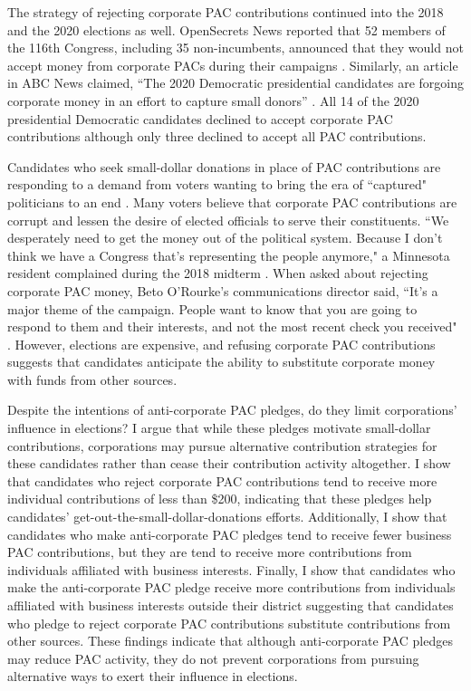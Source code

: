 \documentclass[12pt]{article}
\begin{document}
The strategy of rejecting corporate PAC contributions continued into the 2018 and the 2020 elections as well. OpenSecrets News reported that 52 members of the 116th Congress, including 35 non-incumbents, announced that they would not accept money from corporate PACs during their campaigns \citep{evers-hillstrom2018}. Similarly, an article in ABC News claimed, ``The 2020 Democratic presidential candidates are forgoing corporate money in an effort to capture small donors'' \citep{harper2019}. All 14 of the 2020 presidential Democratic candidates declined to accept corporate PAC contributions although only three declined to accept all PAC contributions. 

Candidates who seek small-dollar donations in place of PAC contributions are responding to a demand from voters wanting to bring the era of ``captured" politicians to an end \citep{culberson2019}. Many voters believe that corporate PAC contributions are corrupt and lessen the desire of elected officials to serve their constituents. ``We desperately need to get the money out of the political system. Because I don’t think we have a Congress that’s representing the people anymore," a Minnesota resident complained during the 2018 midterm \citep{stockman2018}. When asked about rejecting corporate PAC money, Beto O’Rourke's communications director said, ``It’s a major theme of the campaign. People want to know that you are going to respond to them and their interests, and not the most recent check you received" \citep{stockman2018}. However, elections are expensive, and refusing corporate PAC contributions suggests that candidates anticipate the ability to substitute corporate money with funds from other sources.

Despite the intentions of anti-corporate PAC pledges, do they limit corporations' influence in elections? I argue that while these pledges motivate small-dollar contributions, corporations may pursue alternative contribution strategies for these candidates rather than cease their contribution activity altogether. I show that candidates who reject corporate PAC contributions tend to receive more individual contributions of less than \$200, indicating that these pledges help candidates' get-out-the-small-dollar-donations efforts. Additionally, I show that candidates who make anti-corporate PAC pledges tend to receive fewer business PAC contributions, but they are tend to receive more contributions from individuals affiliated with business interests. Finally, I show that candidates who make the anti-corporate PAC pledge receive more contributions from individuals affiliated with business interests outside their district suggesting that candidates who pledge to reject corporate PAC contributions substitute contributions from other sources. These findings indicate that although anti-corporate PAC pledges may reduce PAC activity, they do not prevent corporations from pursuing alternative ways to exert their influence in elections. 
\end{document}

